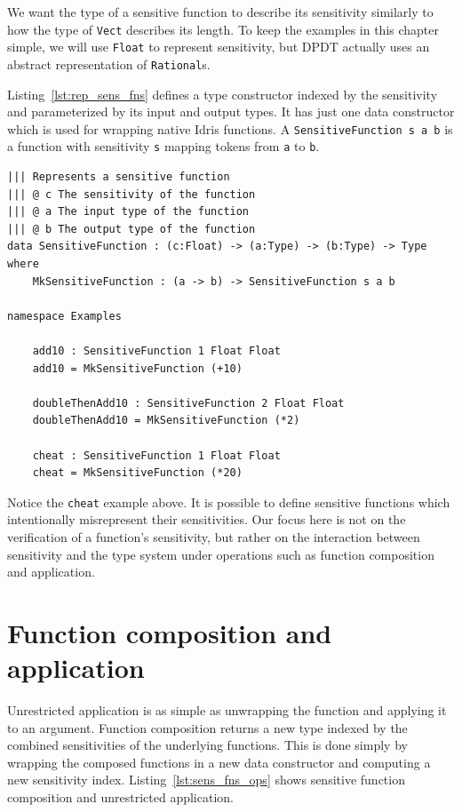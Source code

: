 \documentclass[12pt]{report}
\begin{document}
We want the type of a sensitive function to describe its sensitivity similarly to how the type of \texttt{Vect} describes its length.
To keep the examples in this chapter simple, we will use \texttt{Float} to represent sensitivity, but DPDT actually uses an abstract representation of \texttt{Rational}s.

Listing~\ref{lst:rep_sens_fns} defines a type constructor indexed by the sensitivity and parameterized by its input and output types.
It has just one data constructor which is used for wrapping native Idris functions.
A \texttt{SensitiveFunction s a b} is a function with sensitivity \texttt{s} mapping tokens from \texttt{a} to \texttt{b}.

\begin{lstlisting}[caption={Representing sensitive functions},label={lst:rep_sens_fns}]
||| Represents a sensitive function
||| @ c The sensitivity of the function
||| @ a The input type of the function
||| @ b The output type of the function
data SensitiveFunction : (c:Float) -> (a:Type) -> (b:Type) -> Type where
    MkSensitiveFunction : (a -> b) -> SensitiveFunction s a b

namespace Examples

    add10 : SensitiveFunction 1 Float Float
    add10 = MkSensitiveFunction (+10)

    doubleThenAdd10 : SensitiveFunction 2 Float Float
    doubleThenAdd10 = MkSensitiveFunction (*2)

    cheat : SensitiveFunction 1 Float Float
    cheat = MkSensitiveFunction (*20)
\end{lstlisting}

Notice the \texttt{cheat} example above.
It is possible to define sensitive functions which intentionally misrepresent their sensitivities.
Our focus here is not on the verification of a function's sensitivity, but rather on the interaction between sensitivity and the type system under operations such as function composition and application.

\section{Function composition and application}

Unrestricted application is as simple as unwrapping the function and applying it to an argument.
Function composition returns a new type indexed by the combined sensitivities of the underlying functions.
This is done simply by wrapping the composed functions in a new data constructor and computing a new sensitivity index.
Listing~\ref{lst:sens_fns_ops} shows sensitive function composition and unrestricted application.
\end{document}

